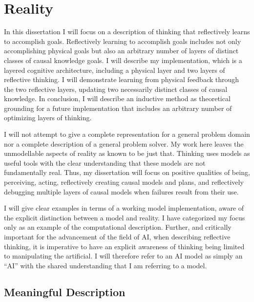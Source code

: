 \chapter{Reality}
\label{chapter:reality}

In this dissertation I will focus on a description of thinking that
reflectively learns to accomplish goals.  Reflectively learning to
accomplish goals includes not only accomplishing physical goals but
also an arbitrary number of layers of distinct classes of causal
knowledge goals.  I will describe my implementation, which is a
layered cognitive architecture, including a physical layer and two
layers of reflective thinking.  I will demonstrate learning from
physical feedback through the two reflective layers, updating two
necessarily distinct classes of causal knowledge.  In conclusion, I
will describe an inductive method as theoretical grounding for a
future implementation that includes an arbitrary number of optimizing
layers of thinking.

I will not attempt to give a complete representation for a general
problem domain nor a complete description of a general problem solver.
My work here leaves the unmodellable aspects of reality as known to be
just that.  Thinking uses models as useful tools with the clear
understanding that these models are not fundamentally real.  Thus, my
dissertation will focus on positive qualities of being, perceiving,
acting, reflectively creating causal models and plans, and
reflectively debugging multiple layers of causal models when failures
result from their use.

I will give clear examples in terms of a working model implementation,
aware of the explicit distinction between a model and reality.  I have
categorized my focus only as an example of the computational
description.  Further, and critically important for the advancement of
the field of AI, when describing reflective thinking, it is imperative
to have an explicit awareness of thinking being limited to
manipulating the artificial.  I will therefore refer to an AI model as
simply an ``AI'' with the shared understanding that I am referring to
a model.

\section{Meaningful Description}

